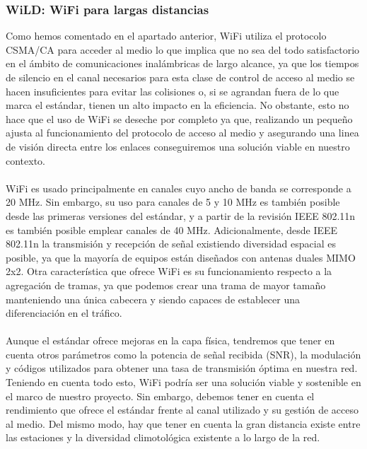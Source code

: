 \subsubsection{WiLD: WiFi para largas distancias}
Como hemos comentado en el apartado anterior, WiFi utiliza el protocolo CSMA/CA para acceder al medio lo que implica que no sea del todo satisfactorio en el ámbito de comunicaciones inalámbricas de largo alcance, ya que los tiempos de silencio en el canal necesarios para esta clase de control de acceso al medio se hacen insuficientes para evitar las colisiones o, si se agrandan fuera de lo que marca el estándar, tienen un alto impacto en la eficiencia. No obstante, esto no hace que el uso de WiFi se deseche por completo ya que, realizando un pequeño ajusta al funcionamiento del protocolo de acceso al medio y asegurando una linea de visión directa entre los enlaces conseguiremos una solución viable en nuestro contexto.\\\\
		
WiFi es usado principalmente en canales cuyo ancho de banda se corresponde a 20 MHz. Sin embargo, su uso para canales de 5 y 10 MHz es también posible desde las primeras versiones del estándar, y a partir de la revisión IEEE 802.11n es también posible emplear canales de 40 MHz. Adicionalmente, desde IEEE 802.11n la transmisión y recepción de señal existiendo diversidad espacial es posible, ya que la mayoría de equipos están diseñados con antenas duales MIMO 2x2. Otra característica que ofrece WiFi es su funcionamiento respecto a la agregación de tramas, ya que podemos crear una trama de mayor tamaño manteniendo una única cabecera y siendo capaces de establecer una diferenciación en el tráfico. \\\\
		
Aunque el estándar ofrece mejoras en la capa física, tendremos que tener en cuenta otros parámetros como la potencia de señal recibida (SNR), la modulación y códigos utilizados para obtener una tasa de transmisión óptima en nuestra red. Teniendo en cuenta todo esto, WiFi podría ser una solución viable y sostenible en el marco de nuestro proyecto. Sin embargo, debemos tener en cuenta el rendimiento que ofrece el estándar frente al canal utilizado y su gestión de acceso al medio. Del mismo modo, hay que tener en cuenta la gran distancia existe entre las estaciones y la diversidad climotológica existente a lo largo de la red.\\\\

